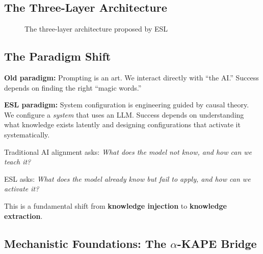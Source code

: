 \documentclass[11pt,a4paper]{article}
\begin{document}
\subsection{The Three-Layer Architecture}

\begin{figure}[H]
\centering
{}
\caption{The three-layer architecture proposed by ESL}
\end{figure}


\subsection{The Paradigm Shift}

\begin{principlebox}
\textbf{Old paradigm:} Prompting is an art. We interact directly with ``the AI.'' Success depends on finding the right ``magic words.''

\textbf{ESL paradigm:} System configuration is engineering guided by causal theory. We configure a \emph{system} that uses an LLM. Success depends on understanding what knowledge exists latently and designing configurations that activate it systematically.
\end{principlebox}

Traditional AI alignment asks: \emph{What does the model not know, and how can we teach it?}

ESL asks: \emph{What does the model already know but fail to apply, and how can we activate it?}

This is a fundamental shift from \textbf{knowledge injection} to \textbf{knowledge extraction}.


\subsection{Mechanistic Foundations: The $\alpha$-KAPE Bridge}
\end{document}
